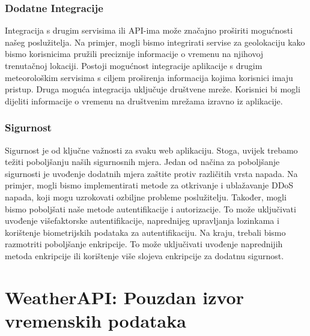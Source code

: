 \documentclass[times, utf8, zavrsni]{fer}
\begin{document}
\subsection{Dodatne Integracije}
Integracija s drugim servisima ili API-ima može značajno proširiti mogućnosti našeg poslužitelja. Na primjer, mogli bismo integrirati servise za geolokaciju kako bismo korisnicima pružili preciznije informacije o vremenu na njihovoj trenutačnoj lokaciji. Postoji mogućnost integracije aplikacije s drugim meteorološkim servisima s ciljem proširenja
informacija kojima korisnici imaju pristup. Druga moguća integracija uključuje društvene mreže. Korisnici bi mogli dijeliti informacije o vremenu na društvenim mrežama izravno iz aplikacije.

\subsection{Sigurnost}
Sigurnost je od ključne važnosti za svaku web aplikaciju. Stoga, uvijek trebamo težiti poboljšanju naših sigurnosnih mjera. Jedan od načina za poboljšanje sigurnosti je uvođenje dodatnih mjera zaštite protiv različitih vrsta napada. Na primjer, mogli bismo implementirati metode za otkrivanje i ublažavanje DDoS napada, koji mogu uzrokovati ozbiljne probleme poslužitelju. Također, mogli bismo poboljšati naše metode autentifikacije i autorizacije. To može uključivati uvođenje višefaktorske autentifikacije, naprednijeg upravljanja lozinkama i korištenje biometrijskih podataka za autentifikaciju. Na kraju, trebali bismo razmotriti poboljšanje enkripcije. To može uključivati uvođenje naprednijih metoda enkripcije ili korištenje više slojeva enkripcije za dodatnu sigurnost.

\chapter{WeatherAPI: Pouzdan izvor vremenskih podataka}
\end{document}

